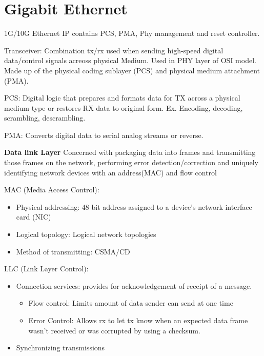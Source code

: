 \section{Gigabit Ethernet}

1G/10G Ethernet IP contains PCS, PMA, Phy management and reset controller.

Transceiver: Combination tx/rx used when sending high-speed digital data/control signals acreoss physical Medium. Used in PHY layer of OSI model. Made up of the physical coding sublayer (PCS) and physical medium attachment (PMA). 

PCS: Digital logic that prepares and formats data for TX across a physical medium type or restores RX data to original form. Ex. Encoding, decoding, scrambling, descrambling.

PMA: Converts digital data to serial analog streams or reverse. 

\textbf{Data link Layer} Concerned with packaging data into frames and transmitting those frames on the network, performing error detection/correction and uniquely identifying network devices with an address(MAC) and flow control

MAC (Media Access Control):
\begin{itemize}
    \item Physical addressing: 48 bit address assigned to a device's network interface card (NIC)
    \item Logical topology: Logical network topologies
    \item Method of transmitting: CSMA/CD
\end{itemize}

LLC (Link Layer Control):

\begin{itemize}
\item Connection services: provides for acknowledgement of receipt of a message.
\begin{itemize}
    \item Flow control: Limits amount of data sender can send at one time 
    \item Error Control: Allows rx to let tx know when an expected data frame wasn't received or was corrupted by using a checksum.
\end{itemize}

\item Synchronizing transmissions
\end{itemize}

